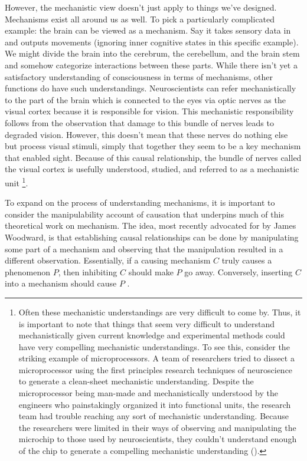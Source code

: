 However, the mechanistic view doesn't just apply to things we've
designed. Mechanisms exist all around us as well. To pick a particularly
complicated example: the brain can be viewed as a mechanism. Say it
takes sensory data in and outputs movements (ignoring inner cognitive
states in this specific example). We might divide the brain into the
cerebrum, the cerebellum, and the brain stem and somehow categorize
interactions between these parts. While there isn't yet a satisfactory
understanding of consciousness in terms of mechanisms, other functions
do have such understandings. Neuroscientists can refer mechanistically
to the part of the brain which is connected to the eyes via optic nerves
as the visual cortex because it is responsible for vision. This
mechanistic responsibility follows from the observation that damage to
this bundle of nerves leads to degraded vision. However, this doesn't
mean that these nerves do nothing else but process visual stimuli,
simply that together they seem to be a key mechanism that enabled sight.
Because of this causal relationship, the bundle of nerves called the
visual cortex is usefully understood, studied, and referred to as a
mechanistic unit \footnote{Often these mechanistic understandings are
  very difficult to come by. Thus, it is important to note that things
  that seem very difficult to understand mechanistically given current
  knowledge and experimental methods could have very compelling
  mechanistic understandings. To see this, consider the striking example
  of microprocessors. A team of researchers tried to dissect a
  microprocessor using the first principles research techniques of
  neuroscience to generate a clean-sheet mechanistic understanding.
  Despite the microprocessor being man-made and mechanistically
  understood by the engineers who painstakingly organized it into
  functional units, the research team had trouble reaching any sort of
  mechanistic understanding. Because the researchers were limited in
  their ways of observing and manipulating the microchip to those used
  by neuroscientists, they couldn't understand enough of the chip to
  generate a compelling mechanistic understanding
  (\autocite{jonasCouldNeuroscientistUnderstand2017}).}.

To expand on the process of understanding mechanisms, it is important to
consider the manipulability account of causation that underpins much of
this theoretical work on mechanism. The idea, most recently advocated
for by James Woodward, is that establishing causal relationships can be
done by manipulating some part of a mechanism and observing that the
manipulation resulted in a different observation. Essentially, if a
causing mechanism \(C\) truly causes a phenomenon \(P\), then inhibiting
\(C\) should make \(P\) go away. Conversely, inserting \(C\) into a
mechanism should cause \(P\)
\autocite{woodwardScientificExplanation2019}.

